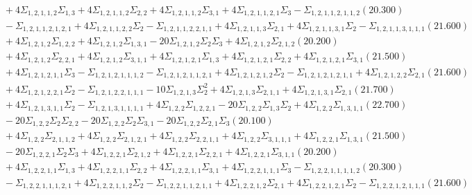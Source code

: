 \documentclass[12pt]{article}
\begin{document}
\begin{landscape}
\begin{align*}
		&\quad\quad +4\Sigma_{1,2,1,1,2}\Sigma_{1,3}+4\Sigma_{1,2,1,1,2}\Sigma_{2,2}+4\Sigma_{1,2,1,1,2}\Sigma_{3,1}+4\Sigma_{1,2,1,1,2,1}\Sigma_{3}-\Sigma_{1,2,1,1,2,1,1,2}(20.300) \\ 
		&\quad\quad -\Sigma_{1,2,1,1,2,1,2,1}+4\Sigma_{1,2,1,1,2,2}\Sigma_{2}-\Sigma_{1,2,1,1,2,2,1,1}+4\Sigma_{1,2,1,1,3}\Sigma_{2,1}+4\Sigma_{1,2,1,1,3,1}\Sigma_{2}-\Sigma_{1,2,1,1,3,1,1,1}(21.600) \\ 
		&\quad\quad +4\Sigma_{1,2,1,2}\Sigma_{1,2,2}+4\Sigma_{1,2,1,2}\Sigma_{1,3,1}-20\Sigma_{1,2,1,2}\Sigma_{2}\Sigma_{3}+4\Sigma_{1,2,1,2}\Sigma_{2,1,2}(20.200) \\ 
		&\quad\quad +4\Sigma_{1,2,1,2}\Sigma_{2,2,1}+4\Sigma_{1,2,1,2}\Sigma_{3,1,1}+4\Sigma_{1,2,1,2,1}\Sigma_{1,3}+4\Sigma_{1,2,1,2,1}\Sigma_{2,2}+4\Sigma_{1,2,1,2,1}\Sigma_{3,1}(21.500) \\ 
		&\quad\quad +4\Sigma_{1,2,1,2,1,1}\Sigma_{3}-\Sigma_{1,2,1,2,1,1,1,2}-\Sigma_{1,2,1,2,1,1,2,1}+4\Sigma_{1,2,1,2,1,2}\Sigma_{2}-\Sigma_{1,2,1,2,1,2,1,1}+4\Sigma_{1,2,1,2,2}\Sigma_{2,1}(21.600) \\ 
		&\quad\quad +4\Sigma_{1,2,1,2,2,1}\Sigma_{2}-\Sigma_{1,2,1,2,2,1,1,1}-10\Sigma_{1,2,1,3}\Sigma_{2}^{2}+4\Sigma_{1,2,1,3}\Sigma_{2,1,1}+4\Sigma_{1,2,1,3,1}\Sigma_{2,1}(21.700) \\ 
		&\quad\quad +4\Sigma_{1,2,1,3,1,1}\Sigma_{2}-\Sigma_{1,2,1,3,1,1,1,1}+4\Sigma_{1,2,2}\Sigma_{1,2,2,1}-20\Sigma_{1,2,2}\Sigma_{1,3}\Sigma_{2}+4\Sigma_{1,2,2}\Sigma_{1,3,1,1}(22.700) \\ 
		&\quad\quad -20\Sigma_{1,2,2}\Sigma_{2}\Sigma_{2,2}-20\Sigma_{1,2,2}\Sigma_{2}\Sigma_{3,1}-20\Sigma_{1,2,2}\Sigma_{2,1}\Sigma_{3}(20.100) \\ 
		&\quad\quad +4\Sigma_{1,2,2}\Sigma_{2,1,1,2}+4\Sigma_{1,2,2}\Sigma_{2,1,2,1}+4\Sigma_{1,2,2}\Sigma_{2,2,1,1}+4\Sigma_{1,2,2}\Sigma_{3,1,1,1}+4\Sigma_{1,2,2,1}\Sigma_{1,3,1}(21.500) \\ 
		&\quad\quad -20\Sigma_{1,2,2,1}\Sigma_{2}\Sigma_{3}+4\Sigma_{1,2,2,1}\Sigma_{2,1,2}+4\Sigma_{1,2,2,1}\Sigma_{2,2,1}+4\Sigma_{1,2,2,1}\Sigma_{3,1,1}(20.200) \\ 
		&\quad\quad +4\Sigma_{1,2,2,1,1}\Sigma_{1,3}+4\Sigma_{1,2,2,1,1}\Sigma_{2,2}+4\Sigma_{1,2,2,1,1}\Sigma_{3,1}+4\Sigma_{1,2,2,1,1,1}\Sigma_{3}-\Sigma_{1,2,2,1,1,1,1,2}(20.300) \\ 
		&\quad\quad -\Sigma_{1,2,2,1,1,1,2,1}+4\Sigma_{1,2,2,1,1,2}\Sigma_{2}-\Sigma_{1,2,2,1,1,2,1,1}+4\Sigma_{1,2,2,1,2}\Sigma_{2,1}+4\Sigma_{1,2,2,1,2,1}\Sigma_{2}-\Sigma_{1,2,2,1,2,1,1,1}(21.600) \\ 

\end{align*}
\end{landscape}
\end{document}
